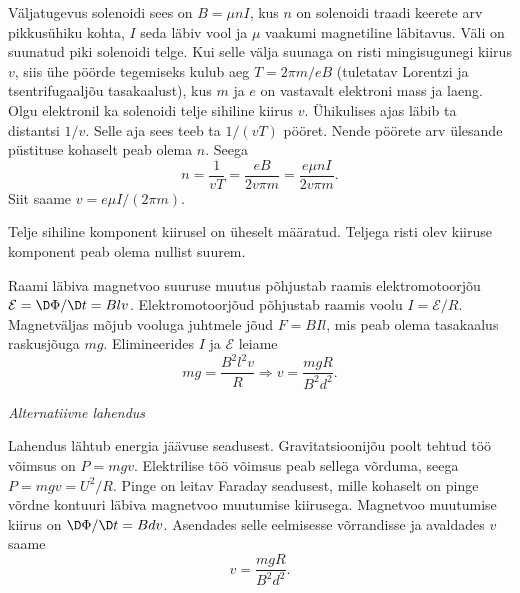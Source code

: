 \documentclass[10pt]{article}
\begin{document}
{%

\solu
Väljatugevus solenoidi sees on $B=\mu nI$, kus $n$ on solenoidi traadi keerete arv pikkusühiku kohta, $I$ seda läbiv vool ja $\mu$ vaakumi magnetiline läbitavus. Väli on suunatud piki solenoidi telge. Kui selle välja suunaga on risti mingisugunegi kiirus $v$, siis ühe pöörde tegemiseks kulub aeg $T=2\pi m/eB$ (tuletatav Lorentzi ja tsentrifugaaljõu tasakaalust), kus $m$ ja $e$ on vastavalt elektroni mass ja laeng. Olgu elektronil ka solenoidi telje sihiline kiirus $v$. Ühikulises ajas läbib ta distantsi $1/v$. Selle aja sees teeb ta $1/(vT)$ pööret. Nende pöörete arv ülesande püstituse kohaselt peab olema $n$. Seega
\[
n=\frac{1}{vT}=\frac{eB}{2v\pi m}=\frac{e\mu nI}{2v\pi m}.
\]
Siit saame $v=e\mu I/(2\pi m)$.

Telje sihiline komponent kiirusel on üheselt määratud. Teljega risti olev kiiruse komponent peab olema nullist suurem.
\probend
\bigskip


\solu
Raami läbiva magnetvoo suuruse muutus põhjustab raamis elektromotoorjõu $\mathcal{E} = \D\Phi/\D t = Blv$. Elektromotoorjõud põhjustab raamis voolu $I = \mathcal{E}/R$. Magnetväljas mõjub vooluga juhtmele jõud $F = BIl$, mis peab olema tasakaalus raskusjõuga $mg$. Elimineerides $I$ ja $\mathcal{E}$ leiame
\[
m g=\frac{B^{2} l^{2} v}{R} \Rightarrow v=\frac{m g R}{B^{2} d^{2}}.
\]

\medskip

\emph{Alternatiivne lahendus}

Lahendus lähtub energia jäävuse seadusest. Gravitatsioonijõu poolt tehtud töö võimsus on $P = mgv$. Elektrilise töö võimsus peab sellega võrduma, seega $P = mgv = U^2/R$. Pinge on leitav Faraday seadusest, mille kohaselt on pinge võrdne kontuuri läbiva magnetvoo muutumise kiirusega. Magnetvoo muutumise kiirus on $\D\Phi/\D t = Bd v$. Asendades selle eelmisesse võrrandisse ja avaldades $v$ saame 
\[
v=\frac{m g R}{B^{2} d^{2}}.
\]
\probend
\bigskip


}
\end{document}
